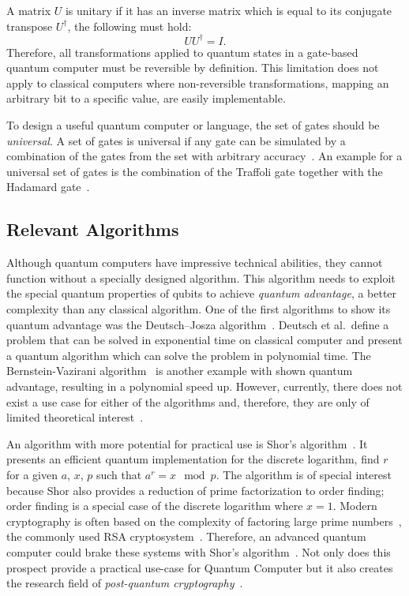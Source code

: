 A matrix $U$ is unitary if it has an inverse matrix which is equal to its conjugate transpose $U^\dagger$, \ie the following must hold:
\begin{equation*}
    U U^\dagger = I.
\end{equation*}
Therefore, all transformations applied to quantum states in a gate-based quantum computer must be reversible by definition. This limitation does not apply to classical computers where non-reversible transformations, \eg mapping an arbitrary bit to a specific value, are easily implementable. 

To design a useful quantum computer or language, the set of gates should be \emph{universal}. A set of gates is universal if any gate can be simulated by a combination of the gates from the set with arbitrary accuracy~\cite{BrBr01}. An example for a universal set of gates is the combination of the Traffoli gate together with the Hadamard gate~\cite{DiCh20}.

\subsection{Relevant Algorithms}
Although quantum computers have impressive technical abilities, they cannot function without a specially designed algorithm. This algorithm needs to exploit the special quantum properties of qubits to achieve \emph{quantum advantage}, \ie a better complexity than any classical algorithm. One of the first algorithms to show its quantum advantage was the Deutsch–Josza algorithm~\cite{DeJo92}. Deutsch et al.\ define a problem that can be solved in exponential time on classical computer and present a quantum algorithm which can solve the problem in polynomial time. The Bernstein-Vazirani algorithm~\cite{BeVa93} is another example with shown quantum advantage, resulting in a polynomial speed up. However, currently, there does not exist a use case for either of the algorithms and, therefore, they are only of limited theoretical interest~\cite{DiCh20}.  

An algorithm with more potential for practical use is Shor's algorithm~\cite{Shor97}. It presents an efficient quantum implementation for the discrete logarithm, \ie find $r$ for a given $a$, $x$, $p$ such that $a^r = x \mod p$. The algorithm is of special interest because Shor also provides a reduction of prime factorization to order finding; order finding is a special case of the discrete logarithm where $x = 1$. Modern cryptography is often based on the complexity of factoring large prime numbers~, \eg the commonly used RSA cryptosystem~\cite{RSA78}. Therefore, an advanced quantum computer could brake these systems with Shor's algorithm~\cite{MVZJ18}. Not only does this prospect provide a practical use-case for Quantum Computer but it also creates the research field of \emph{post-quantum cryptography}~\cite{BeLa17}.  

